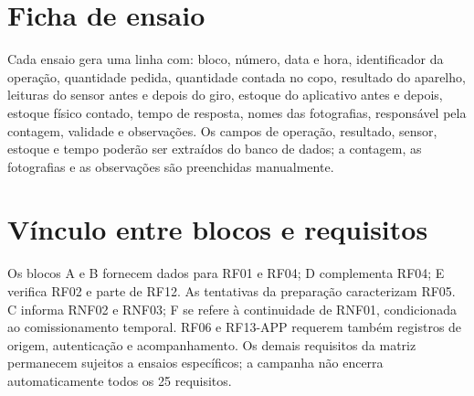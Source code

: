 \section{Ficha de ensaio}
Cada ensaio gera uma linha com: bloco, número, data e hora, identificador da operação, quantidade pedida, quantidade contada no copo, resultado do aparelho, leituras do sensor antes e depois do giro, estoque do aplicativo antes e depois, estoque físico contado, tempo de resposta, nomes das fotografias, responsável pela contagem, validade e observações. Os campos de operação, resultado, sensor, estoque e tempo poderão ser extraídos do banco de dados; a contagem, as fotografias e as observações são preenchidas manualmente.


\section{Vínculo entre blocos e requisitos}
Os blocos A e B fornecem dados para RF01 e RF04; D complementa RF04; E verifica RF02 e parte de RF12. As tentativas da preparação caracterizam RF05. C informa RNF02 e RNF03; F se refere à continuidade de RNF01, condicionada ao comissionamento temporal. RF06 e RF13-APP requerem também registros de origem, autenticação e acompanhamento. Os demais requisitos da matriz permanecem sujeitos a ensaios específicos; a campanha não encerra automaticamente todos os 25 requisitos.


